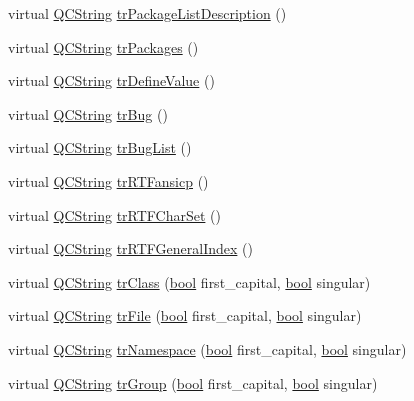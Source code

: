 \begin{DoxyCompactItemize}
\item 
virtual \hyperlink{class_q_c_string}{Q\+C\+String} \hyperlink{class_translator_greek_a42741f5f19bc980bc37ea978db55fa19}{tr\+Package\+List\+Description} ()
\item 
virtual \hyperlink{class_q_c_string}{Q\+C\+String} \hyperlink{class_translator_greek_aaa60df56a2b291bbff3ec287cf04f953}{tr\+Packages} ()
\item 
virtual \hyperlink{class_q_c_string}{Q\+C\+String} \hyperlink{class_translator_greek_a6ed8fdfda39fe8f43341cd81817c3ad0}{tr\+Define\+Value} ()
\item 
virtual \hyperlink{class_q_c_string}{Q\+C\+String} \hyperlink{class_translator_greek_a36e32ed6f3a383fbc5f0fce7c6c9071c}{tr\+Bug} ()
\item 
virtual \hyperlink{class_q_c_string}{Q\+C\+String} \hyperlink{class_translator_greek_ad4bae874aef6051ba63c5766391adf09}{tr\+Bug\+List} ()
\item 
virtual \hyperlink{class_q_c_string}{Q\+C\+String} \hyperlink{class_translator_greek_a61f354a3621da4c121345eae8b2846e4}{tr\+R\+T\+Fansicp} ()
\item 
virtual \hyperlink{class_q_c_string}{Q\+C\+String} \hyperlink{class_translator_greek_a34c20fb3ca506b053c375cd1a0a1feaa}{tr\+R\+T\+F\+Char\+Set} ()
\item 
virtual \hyperlink{class_q_c_string}{Q\+C\+String} \hyperlink{class_translator_greek_a638872784be97651695123fba852387e}{tr\+R\+T\+F\+General\+Index} ()
\item 
virtual \hyperlink{class_q_c_string}{Q\+C\+String} \hyperlink{class_translator_greek_af7ebcac7b128a0f2b6b2cebdf92e982a}{tr\+Class} (\hyperlink{qglobal_8h_a1062901a7428fdd9c7f180f5e01ea056}{bool} first\+\_\+capital, \hyperlink{qglobal_8h_a1062901a7428fdd9c7f180f5e01ea056}{bool} singular)
\item 
virtual \hyperlink{class_q_c_string}{Q\+C\+String} \hyperlink{class_translator_greek_ad17af66495dad72776b8105237b5ed7b}{tr\+File} (\hyperlink{qglobal_8h_a1062901a7428fdd9c7f180f5e01ea056}{bool} first\+\_\+capital, \hyperlink{qglobal_8h_a1062901a7428fdd9c7f180f5e01ea056}{bool} singular)
\item 
virtual \hyperlink{class_q_c_string}{Q\+C\+String} \hyperlink{class_translator_greek_ace34ca7159fe2b92c2d5dda9a42598e8}{tr\+Namespace} (\hyperlink{qglobal_8h_a1062901a7428fdd9c7f180f5e01ea056}{bool} first\+\_\+capital, \hyperlink{qglobal_8h_a1062901a7428fdd9c7f180f5e01ea056}{bool} singular)
\item 
virtual \hyperlink{class_q_c_string}{Q\+C\+String} \hyperlink{class_translator_greek_ace0c2736bdab9426536ad9f7db1c47a2}{tr\+Group} (\hyperlink{qglobal_8h_a1062901a7428fdd9c7f180f5e01ea056}{bool} first\+\_\+capital, \hyperlink{qglobal_8h_a1062901a7428fdd9c7f180f5e01ea056}{bool} singular)

\end{DoxyCompactItemize}
